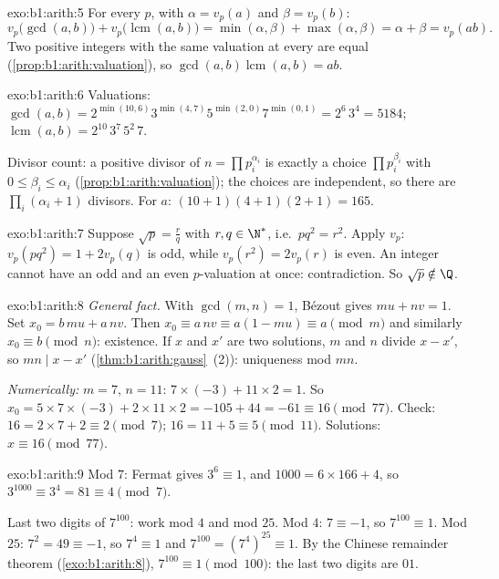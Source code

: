 \begin{solution}{exo:b1:arith:5}
For every  $p$, with $\alpha = v_p(a)$ and $\beta = v_p(b)$:
\[
v_p\bigl(\gcd(a,b)\bigr) + v_p\bigl(\operatorname{lcm}(a,b)\bigr)
= \min(\alpha, \beta) + \max(\alpha, \beta)
= \alpha + \beta = v_p(ab) .
\]
Two positive integers with the same valuation at every  are equal
(\cref{prop:b1:arith:valuation}), so $\gcd(a,b)\operatorname{lcm}(a,b)
= ab$.
\end{solution}

\begin{solution}{exo:b1:arith:6}
Valuations: $\gcd(a, b) = 2^{\min(10,6)} 3^{\min(4,7)} 5^{\min(2,0)}
7^{\min(0,1)} = 2^6\, 3^4 = 5184$;
$\operatorname{lcm}(a,b) = 2^{10}\, 3^7\, 5^2\, 7$.

Divisor count: a positive divisor of $n = \prod p_i^{\alpha_i}$ is
exactly a choice $\prod p_i^{\beta_i}$ with $0 \leq \beta_i \leq
\alpha_i$ (\cref{prop:b1:arith:valuation}); the choices are
independent, so there are $\prod_i (\alpha_i + 1)$ divisors. For $a$:
$(10+1)(4+1)(2+1) = 165$.
\end{solution}

\begin{solution}{exo:b1:arith:7}
Suppose $\sqrt p = \frac rq$ with $r, q \in \N^*$, i.e.\ $p q^2 =
r^2$. Apply $v_p$: $v_p(pq^2) = 1 + 2v_p(q)$ is odd, while $v_p(r^2)
= 2 v_p(r)$ is even. An integer cannot have an odd and an even
$p$-valuation at once: contradiction. So $\sqrt p \notin \Q$.
\end{solution}

\begin{solution}{exo:b1:arith:8}
\emph{General fact.} With $\gcd(m,n) = 1$, Bézout gives $mu + nv = 1$.
Set $x_0 = b\,mu + a\,nv$. Then $x_0 \equiv a\,nv \equiv a(1 - mu)
\equiv a \pmod m$ and similarly $x_0 \equiv b \pmod n$: existence. If
$x$ and $x'$ are two solutions, $m$ and $n$ divide $x - x'$, so
$mn \mid x - x'$ (\cref{thm:b1:arith:gauss}~(2)): uniqueness mod
$mn$.

\emph{Numerically:} $m = 7$, $n = 11$: $7 \times (-3) + 11 \times 2 =
1$. So $x_0 = 5 \times 7 \times (-3) + 2 \times 11 \times 2 = -105 +
44 = -61 \equiv 16 \pmod{77}$. Check: $16 = 2\times 7 + 2 \equiv 2
\pmod 7$; $16 = 11 + 5 \equiv 5 \pmod{11}$. Solutions: $x \equiv 16
\pmod{77}$.
\end{solution}

\begin{solution}{exo:b1:arith:9}
Mod $7$: Fermat gives $3^6 \equiv 1$, and $1000 = 6 \times 166 + 4$,
so $3^{1000} \equiv 3^4 = 81 \equiv 4 \pmod 7$.

Last two digits of $7^{100}$: work mod $4$ and mod $25$. Mod $4$: $7
\equiv -1$, so $7^{100} \equiv 1$. Mod $25$: $7^2 = 49 \equiv -1$, so
$7^4 \equiv 1$ and $7^{100} = (7^4)^{25} \equiv 1$. By the Chinese
remainder theorem (\cref{exo:b1:arith:8}), $7^{100} \equiv 1
\pmod{100}$: the last two digits are $01$.
\end{solution}


